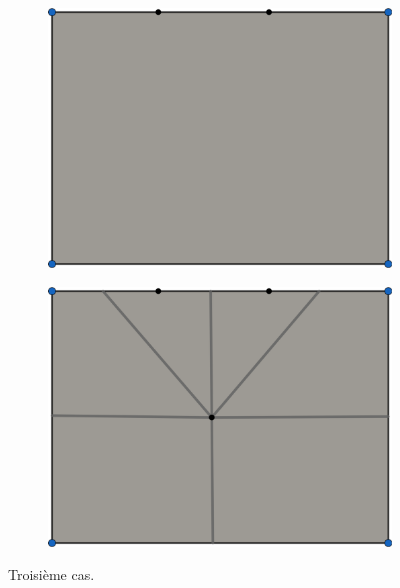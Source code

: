 \begin{figure}[h!]
\centering
\begin{subfigure}{0.49\textwidth}
    \includegraphics[width=\textwidth]{images/limit_cycle_5.pdf}
\end{subfigure}
\hfill
\begin{subfigure}{0.49\textwidth}
    \includegraphics[width=\textwidth]{images/limit_cycle_6.pdf}
\end{subfigure}
\caption{Troisième cas.}
\label{fig:cycle_3}
\end{figure}


